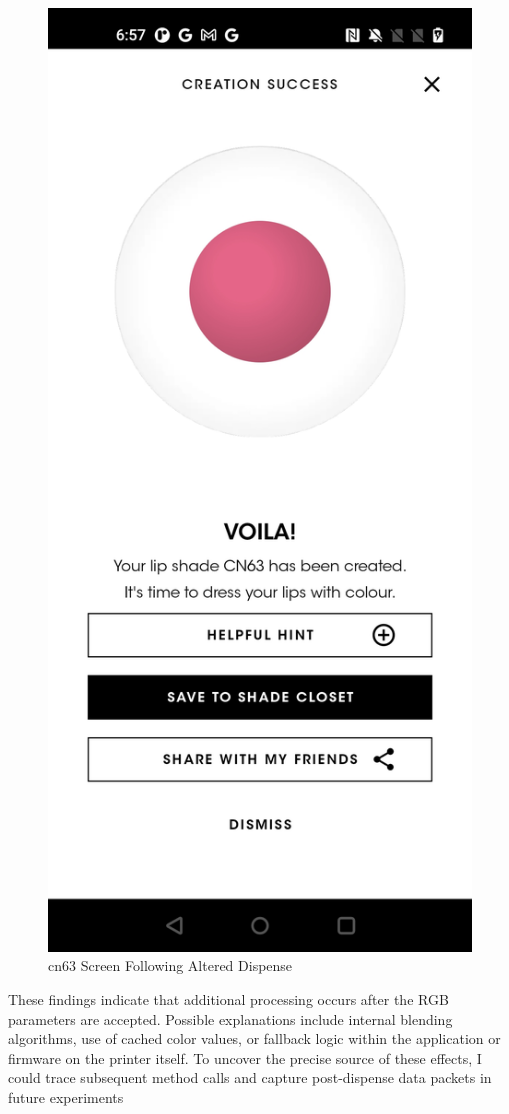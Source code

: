 \begin{figure}[H]
	\centering
	\includegraphics[scale=.15]{cn63}
	\caption{cn63 Screen Following Altered Dispense}
	\label{fig:cn63}
\end{figure}

These findings indicate that additional processing occurs after the RGB parameters are accepted. Possible explanations include internal blending algorithms, use of cached color values, or fallback logic within the application or firmware on the printer itself. To uncover the precise source of these effects, I could trace subsequent method calls and capture post-dispense data packets in future experiments


